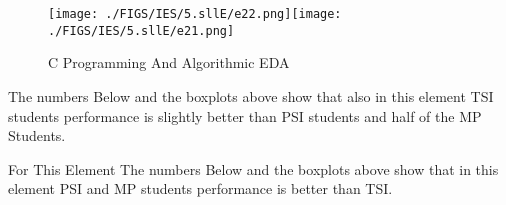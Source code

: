 \documentclass[12pt]{extreport}
\begin{document}
\begin{figure}[H]
	\centering
	\texttt{[image: ./FIGS/IES/5.sllE/e22.png]}\texttt{[image: ./FIGS/IES/5.sllE/e21.png]}
	\caption{C Programming And Algorithmic EDA}
	\label{fig:62}
\end{figure}

The numbers Below and the boxplots above show that also in this element  TSI students performance is slightly better than PSI students and half of the MP Students.

For This Element The numbers Below and the boxplots above show that in this element  PSI and MP students performance is  better than TSI.

\begin{comment}
\subparagraph{Interpretation of the Box-plots:}
For This Element 

\begin{enumerate}	
	\item The MP Class Box-Plot:
	\begin{enumerate}
		\item MAX = a {} {} {} {} {} {} {} {} UQ = b {} {} {} {} {} {} {} {} Median = c
		\item LQ = d {} {} {} {} {} {} {} {}  MIN =	l {} {} {} {} {} {} {} {}  IQR = e - f = g
	\end{enumerate}
	\item The PSI Class Box-Plot:
	\begin{enumerate}
		\item MAX = a {} {} {} {} {} {} {} {} UQ = b {} {} {} {} {} {} {} {} Median = c
		\item LQ = d {} {} {} {} {} {} {} {}  MIN =	e {} {} {} {} {} {} {} {} IQR = f - g = h	
	\end{enumerate}
	\item The TSI Class Box-Plot:
	\begin{enumerate}
		\item MAX = a {} {} {} {} {} {} {} {} UQ = b {} {} {} {} {} {} {} {} Median = c
		\item LQ = d {} {} {} {} {} {} {} {} MIN = e {} {} {} {} {} {} {} {} IQR = f - g = h	
	\end{enumerate}
\end{enumerate}


\subparagraph{Interpretation of the histogram:}
This Frequency Distribution is (Skeness) with the following descriptive statistics:
\begin{enumerate}
	\item Mean = 
	\item STD = 
	\item Range = a - b = c
	\item IQR = a-b = c 
\end{enumerate}
\end{comment}
\end{document}
